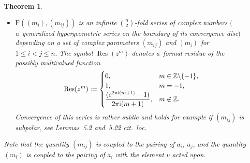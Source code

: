 \documentclass[pdftex]{sigma}%
\numberwithin{equation}{section}
\newtheorem{teo}{Theorem}[section]
\newcommand{\Z}{\mathbb{Z}}
\newcommand{\Fp}{\mathrm{F}}
\begin{document}
\begin{teo}
\begin{itemize}
\begin{itemize}
	\end{itemize}
	\item $\Fp((m_i),(m_{ij}))$ is an infinite ${n\choose 2}$-fold series of complex numbers $($a~generalized hypergeometric series on the boundary of its convergence disc$)$ depending on a set of complex parameters $(m_{ij})$ and $(m_i)$ for $1\leq i<j\leq n$. The symbol $\operatorname{Res}(z^m)$ denotes a~formal residue of the possibly multivalued function
	\[\operatorname{Res}(z^m)
	 :=  \begin{cases}
	0, & m\in\Z \backslash\{-1\},\\
	1, & m= -1,\\
	\dfrac{({\rm e}^{2\pi{\rm i} (m+1)}-1)}{2\pi{\rm i}(m+1)},
	& m\not\in\Z.
	\end{cases}\]
	Convergence of this series is rather subtle and holds for example if $(m_{ij})$ is subpolar, see Lemmas~{\rm 5.2} and~{\rm 5.22} cit.~loc.
	\end{itemize}
Note that the quantity $(m_{ij})$ is coupled to the pairing of $a_i$, $a_j$, and the quantity $(m_i)$ is coupled to the pairing of $a_i$ with the element $v$ acted upon.
\end{teo}
\end{document}
